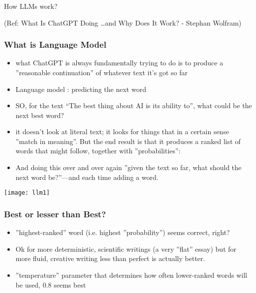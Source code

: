 \begin{frame}[fragile]\frametitle{}
\begin{center}
{\Large How LLMs work?}

{\tiny (Ref: What Is ChatGPT Doing \ldots and Why Does It Work? - Stephan Wolfram)}

\end{center}
\end{frame}


\begin{frame}[fragile]\frametitle{What is Language Model}

\begin{itemize}
\item what ChatGPT is always fundamentally trying to do is to produce a ''reasonable continuation'' of whatever text it's got so far
\item Language model : predicting the next word
\item SO, for the text ``The best thing about AI is its ability to'', what could be the next best word?
\item  it doesn’t look at literal text; it looks for things that in a certain sense ''match in meaning''. But the end result is that it produces a ranked list of words that might follow, together with ''probabilities'':
\item And doing this over and over again ''given the text so far, what should the next word be?''—and each time adding a word.
\end{itemize}	

\begin{center}
\texttt{[image: llm1]}
\end{center}

\end{frame}

\begin{frame}[fragile]\frametitle{Best or lesser than Best?}

\begin{itemize}
\item  ''highest-ranked'' word (i.e. highest ''probability'') seems correct, right?
\item  Ok for more deterministic, scientific writings (a very ''flat'' essay) but for more fluid, creative writing less than perfect is actually better.
\item  ''temperature'' parameter that determines how often lower-ranked words will be used, 0.8 seems best
\end{itemize}	


\end{frame}

